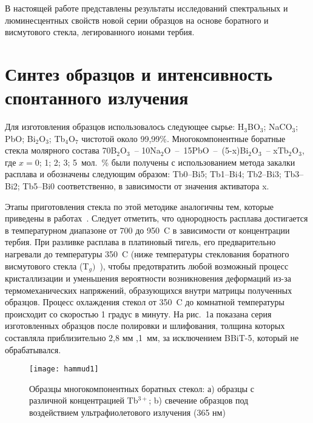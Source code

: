 \documentclass[press]{vestnik}
\begin{document}
В настоящей работе представлены результаты исследований спектральных и 
люминесцентных свойств новой серии образцов на основе боратного и 
висмутового стекла, легированного ионами тербия.

\section{Синтез образцов и интенсивность спонтанного излучения}

Для изготовления образцов использовалось следующее сырье: H$_{3}$BO$_{3}$; 
NaCO$_{3}$; PbO; Bi$_{2}$O$_{3}$; Tb$_{4}$O$_{7}$ чистотой около 99,99{\%}. 
Многокомпонентные боратные стекла молярного состава 70B$_{2}$O$_{3}$~-- 
10Na$_{2}$O~--~15PbO~--~(5-x)Bi$_{2}$O$_{3}$~-- xTb$_{2}$O$_{3}$, где $x=0$; 1; 2; 3; 5~мол.~{\%} были получены с использованием метода закалки 
расплава и обозначены следующим образом: Tb0--Bi5; Tb1--Bi4; Tb2--Bi3; Tb3--Bi2; 
Tb5--Bi0 соответственно, в зависимости от значения активатора x.

Этапы приготовления стекла по этой методике аналогичны тем, которые 
приведены в работах~\cite{B06,B07}. Следует отметить, что однородность расплава 
достигается в температурном диапазоне от 700 до 950~\textdegree C в 
зависимости от концентрации тербия. При разливке расплава в платиновый 
тигель, его предварительно нагревали до температуры 350~\textdegree C (ниже 
температуры стеклования боратного висмутового стекла (T$_{g})$~\cite{B06,B08}), чтобы 
предотвратить любой возможный процесс кристаллизации и уменьшения 
вероятности возникновения деформаций из-за термомеханических напряжений, 
образующихся внутри матрицы полученных образцов. Процесс охлаждения стекол 
от 350~\textdegree C до комнатной температуры происходит со скоростью 1 
градус в минуту. На рис.~1а показана серия изготовленных образцов после 
полировки и шлифования, толщина которых составляла приблизительно 2,8 мм 
,1~мм, за исключением BBiT-5, который не обрабатывался.

\begin{figure}
\centerline{\texttt{[image: hammud1]}}
\caption{Образцы многокомпонентных боратных стекол: а) образцы с различной 
концентрацией Tb$^{3+}$; b) свечение образцов под воздействием 
ультрафиолетового излучения (365 нм)}
\label{fig1}
\end{figure}
\end{document}
